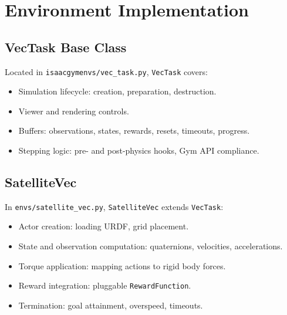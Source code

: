 \documentclass[a4paper,oneside]{book}
\theoremstyle{definition}
\begin{document}
\section{Environment Implementation}

\subsection{VecTask Base Class}
Located in \texttt{isaacgymenvs/vec\_task.py}, \texttt{VecTask} covers:
\begin{itemize}
\item Simulation lifecycle: creation, preparation, destruction.
\item Viewer and rendering controls.
\item Buffers: observations, states, rewards, resets, timeouts, progress.
\item Stepping logic: pre- and post-physics hooks, Gym API compliance.
\end{itemize}

\subsection{SatelliteVec}
In \texttt{envs/satellite\_vec.py}, \texttt{SatelliteVec} extends \texttt{VecTask}:
\begin{itemize}
\item Actor creation: loading URDF, grid placement.
\item State and observation computation: quaternions, velocities, accelerations.
\item Torque application: mapping actions to rigid body forces.
\item Reward integration: pluggable \texttt{RewardFunction}.
\item Termination: goal attainment, overspeed, timeouts.
\end{itemize}
\end{document}
